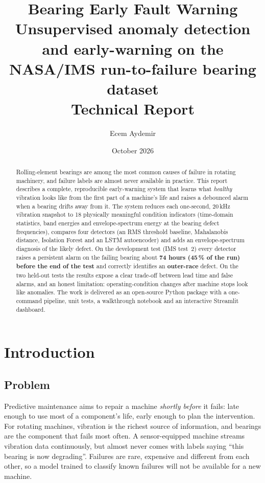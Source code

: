 \documentclass[11pt]{article}
\title{\textbf{Bearing Early Fault Warning}\\[0.3em]
\large Unsupervised anomaly detection and early-warning on the NASA/IMS run-to-failure bearing dataset\\[0.2em]
\normalsize Technical Report}
\author{Ecem Aydemir}
\date{October 2026}
\begin{document}
\maketitle
\thispagestyle{empty}

\begin{abstract}
\noindent
Rolling-element bearings are among the most common causes of failure in rotating machinery, and
failure labels are almost never available in practice. This report describes a complete,
reproducible early-warning system that learns what \emph{healthy} vibration looks like from the first
part of a machine's life and raises a debounced alarm when a bearing drifts away from it. The system
reduces each one-second, 20\,kHz vibration snapshot to 18 physically meaningful condition indicators
(time-domain statistics, band energies and envelope-spectrum energy at the bearing defect
frequencies), compares four detectors (an RMS threshold baseline, Mahalanobis distance, Isolation
Forest and an LSTM autoencoder) and adds an envelope-spectrum diagnosis of the likely defect. On the
development test (IMS test~2) every detector raises a persistent alarm on the failing bearing about
\textbf{74 hours (45\,\% of the run) before the end of the test} and correctly identifies an
\textbf{outer-race} defect. On the two held-out tests the results expose a clear trade-off between lead
time and false alarms, and an honest limitation: operating-condition changes after machine stops
look like anomalies. The work is delivered as an open-source Python package with a one-command
pipeline, unit tests, a walkthrough notebook and an interactive Streamlit dashboard.
\end{abstract}

\tableofcontents
\newpage

\section{Introduction}

\subsection{Problem}
Predictive maintenance aims to repair a machine \emph{shortly before} it fails: late enough to use most
of a component's life, early enough to plan the intervention. For rotating machines, vibration is the
richest source of information, and bearings are the component that fails most often. A
sensor-equipped machine streams vibration data continuously, but almost never comes with labels
saying ``this bearing is now degrading''. Failures are rare, expensive and different from each other,
so a model trained to classify known failures will not be available for a new machine.
\end{document}

